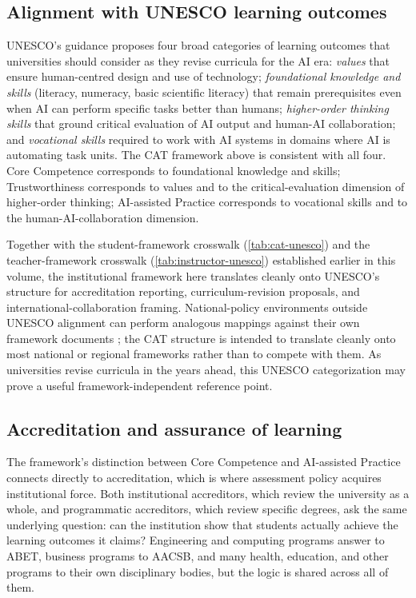 \documentclass{SIAMbook2023}
\begin{document}
\subsection{Alignment with UNESCO learning outcomes}
\label{u:subsec:unesco-outcomes}

UNESCO's guidance \citep{miao2023guidance} proposes four broad categories of learning outcomes that universities should consider as they revise curricula for the AI era: \emph{values} that ensure human-centred design and use of technology; \emph{foundational knowledge and skills} (literacy, numeracy, basic scientific literacy) that remain prerequisites even when AI can perform specific tasks better than humans; \emph{higher-order thinking skills} that ground critical evaluation of AI output and human-AI collaboration; and \emph{vocational skills} required to work with AI systems in domains where AI is automating task units. The CAT framework above is consistent with all four. Core Competence corresponds to foundational knowledge and skills; Trustworthiness corresponds to values and to the critical-evaluation dimension of higher-order thinking; AI-assisted Practice corresponds to vocational skills and to the human-AI-collaboration dimension.

Together with the student-framework crosswalk (\cref{tab:cat-unesco}) and the teacher-framework crosswalk (\cref{tab:instructor-unesco}) established earlier in this volume, the institutional framework here translates cleanly onto UNESCO's structure for accreditation reporting, curriculum-revision proposals, and international-collaboration framing. National-policy environments outside UNESCO alignment can perform analogous mappings against their own framework documents \citep{usde2023artificial}; the CAT structure is intended to translate cleanly onto most national or regional frameworks rather than to compete with them. As universities revise curricula in the years ahead, this UNESCO categorization may prove a useful framework-independent reference point.

\subsection{Accreditation and assurance of learning}
\label{u:subsec:accreditation}%

The framework's distinction between Core Competence and AI-assisted Practice connects directly to accreditation, which is where assessment policy acquires institutional force. Both institutional accreditors, which review the university as a whole, and programmatic accreditors, which review specific degrees, ask the same underlying question: can the institution show that students actually achieve the learning outcomes it claims? Engineering and computing programs answer to ABET, business programs to AACSB, and many health, education, and other programs to their own disciplinary bodies, but the logic is shared across all of them.
\end{document}
